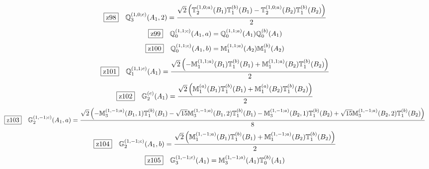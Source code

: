 \documentclass[fleqn,10pt,landscape]{jsarticle}
\begin{document}
\begin{dmath*}
\hspace*{3mm}\fbox{z98}\quad \mathbb{Q}_{3}^{(1,0;c)}(A_{1},2)=\frac{\sqrt{2} \left(\mathbb{T}_{2}^{(1,0;a)}(B_{1}) \mathbb{T}_{1}^{(b)}(B_{1}) - \mathbb{T}_{2}^{(1,0;a)}(B_{2}) \mathbb{T}_{1}^{(b)}(B_{2})\right)}{2}
\end{dmath*}
\begin{dmath*}
\hspace*{3mm}\fbox{z99}\quad \mathbb{Q}_{0}^{(1,1;c)}(A_{1},a)=\mathbb{Q}_{0}^{(1,1;a)}(A_{1}) \mathbb{Q}_{0}^{(b)}(A_{1})
\end{dmath*}
\begin{dmath*}
\hspace*{3mm}\fbox{z100}\quad \mathbb{Q}_{0}^{(1,1;c)}(A_{1},b)=\mathbb{M}_{1}^{(1,1;a)}(A_{2}) \mathbb{M}_{1}^{(b)}(A_{2})
\end{dmath*}
\begin{dmath*}
\hspace*{3mm}\fbox{z101}\quad \mathbb{Q}_{1}^{(1,1;c)}(A_{1})=\frac{\sqrt{2} \left(- \mathbb{M}_{1}^{(1,1;a)}(B_{1}) \mathbb{T}_{1}^{(b)}(B_{1}) + \mathbb{M}_{1}^{(1,1;a)}(B_{2}) \mathbb{T}_{1}^{(b)}(B_{2})\right)}{2}
\end{dmath*}
\begin{dmath*}
\hspace*{3mm}\fbox{z102}\quad \mathbb{G}_{2}^{(c)}(A_{1})=\frac{\sqrt{2} \left(\mathbb{M}_{1}^{(a)}(B_{1}) \mathbb{T}_{1}^{(b)}(B_{1}) + \mathbb{M}_{1}^{(a)}(B_{2}) \mathbb{T}_{1}^{(b)}(B_{2})\right)}{2}
\end{dmath*}
\begin{dmath*}
\hspace*{3mm}\fbox{z103}\quad \mathbb{G}_{2}^{(1,-1;c)}(A_{1},a)=\frac{\sqrt{2} \left(- \mathbb{M}_{3}^{(1,-1;a)}(B_{1},1) \mathbb{T}_{1}^{(b)}(B_{1}) - \sqrt{15} \mathbb{M}_{3}^{(1,-1;a)}(B_{1},2) \mathbb{T}_{1}^{(b)}(B_{1}) - \mathbb{M}_{3}^{(1,-1;a)}(B_{2},1) \mathbb{T}_{1}^{(b)}(B_{2}) + \sqrt{15} \mathbb{M}_{3}^{(1,-1;a)}(B_{2},2) \mathbb{T}_{1}^{(b)}(B_{2})\right)}{8}
\end{dmath*}
\begin{dmath*}
\hspace*{3mm}\fbox{z104}\quad \mathbb{G}_{2}^{(1,-1;c)}(A_{1},b)=\frac{\sqrt{2} \left(\mathbb{M}_{1}^{(1,-1;a)}(B_{1}) \mathbb{T}_{1}^{(b)}(B_{1}) + \mathbb{M}_{1}^{(1,-1;a)}(B_{2}) \mathbb{T}_{1}^{(b)}(B_{2})\right)}{2}
\end{dmath*}
\begin{dmath*}
\hspace*{3mm}\fbox{z105}\quad \mathbb{G}_{3}^{(1,-1;c)}(A_{1})=\mathbb{M}_{3}^{(1,-1;a)}(A_{1}) \mathbb{T}_{0}^{(b)}(A_{1})
\end{dmath*}
\end{document}
